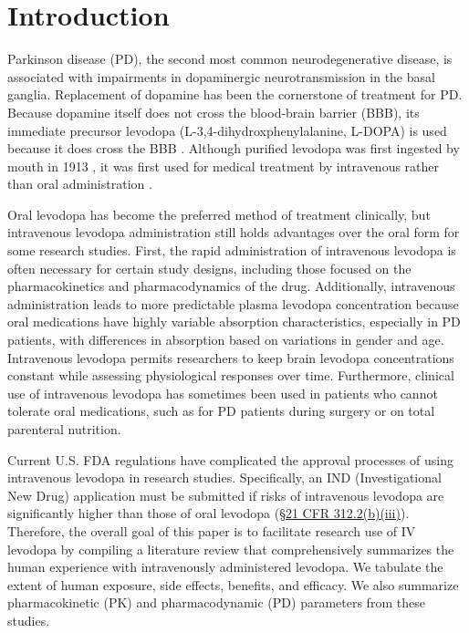 \section{Introduction}
Parkinson disease (PD), the second most common neurodegenerative disease, is associated with impairments in dopaminergic neurotransmission in the basal ganglia. Replacement of dopamine has been the cornerstone of treatment for PD. Because dopamine itself does not cross the blood-brain barrier (BBB), its immediate precursor levodopa (L-3,4-dihydroxphenylalanine, L-DOPA) is used because it does cross the BBB \cite{11763859,13954967,5334614}. Although purified levodopa was first ingested by mouth in 1913 \cite{Roe_1997}, it was first used for medical treatment by intravenous rather than oral administration \cite{14430381,11763859}.
	
Oral levodopa has become the preferred method of treatment clinically, but intravenous levodopa administration still holds advantages over the oral form for some research studies.  First, the rapid administration of intravenous levodopa is often necessary for certain study designs, including those focused on the pharmacokinetics and pharmacodynamics of the drug.  Additionally, intravenous administration leads to more predictable plasma levodopa concentration because oral medications have highly variable absorption characteristics, especially in PD patients\cite{2797454}, with differences in absorption based on variations in gender and age\cite{2775615,12011296}.  Intravenous levodopa permits researchers to keep brain levodopa concentrations constant while assessing physiological responses over time.  Furthermore, clinical use of intravenous levodopa has sometimes been used in patients who cannot tolerate oral medications, such as for PD patients during surgery or on total parenteral nutrition.  

Current U.S. FDA regulations have complicated the approval processes of using intravenous levodopa in research studies\cite{11801806}.  Specifically, an IND (Investigational New Drug) application must be submitted if risks of intravenous levodopa are significantly higher than those of oral levodopa (\href{http://www.accessdata.fda.gov/scripts/cdrh/cfdocs/cfcfr/CFRSearch.cfm?fr=312.2}{\S 21 CFR 312.2(b)(iii)}).  Therefore, the overall goal of this paper is to facilitate research use of IV levodopa by compiling a literature review that comprehensively summarizes the human experience with intravenously administered levodopa.  We tabulate the extent of human exposure, side effects, benefits, and efficacy.  We also summarize pharmacokinetic (PK) and pharmacodynamic (PD) parameters from these studies. 
